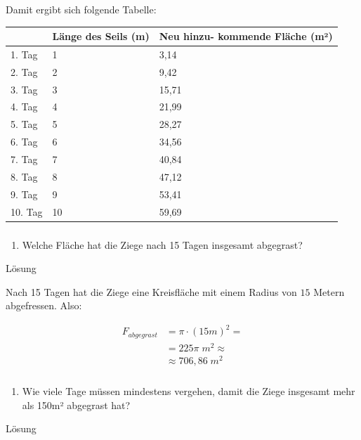\documentclass[
  ngerman,
]{book}
\providecommand{\tightlist}{%
  \setlength{\itemsep}{0pt}\setlength{\parskip}{0pt}}
\begin{document}
Damit ergibt sich folgende Tabelle:

\begin{longtable}[]{@{}lll@{}}
\toprule
& Länge des Seils (m) & Neu hinzu- kommende Fläche (m²)\tabularnewline
\midrule
\endhead
1. Tag & 1 & 3,14\tabularnewline
2. Tag & 2 & 9,42\tabularnewline
3. Tag & 3 & 15,71\tabularnewline
4. Tag & 4 & 21,99\tabularnewline
5. Tag & 5 & 28,27\tabularnewline
6. Tag & 6 & 34,56\tabularnewline
7. Tag & 7 & 40,84\tabularnewline
8. Tag & 8 & 47,12\tabularnewline
9. Tag & 9 & 53,41\tabularnewline
10. Tag & 10 & 59,69\tabularnewline
\bottomrule
\end{longtable}

\hypertarget{section-54}{%
\subsubsection*{}\label{section-54}}

\begin{enumerate}
\def\labelenumi{\alph{enumi})}
\setcounter{enumi}{2}
\tightlist
\item
  Welche Fläche hat die Ziege nach 15 Tagen insgesamt abgegrast?
\end{enumerate}

Lösung

Nach 15 Tagen hat die Ziege eine Kreisfläche mit einem Radius von \(15\) Metern abgefressen. Also:

\[\begin{align} F_{abgegrast} &= \pi \cdot (15m)^2=\\
                              &= 225\pi\;m^2 \approx \\
                              &\approx 706,86\;m^2\end{align}\]

\hypertarget{section-55}{%
\subsubsection*{}\label{section-55}}

\begin{enumerate}
\def\labelenumi{\alph{enumi})}
\setcounter{enumi}{3}
\tightlist
\item
  Wie viele Tage müssen mindestens vergehen, damit die Ziege insgesamt mehr als 150m² abgegrast hat?
\end{enumerate}

Lösung
\end{document}
